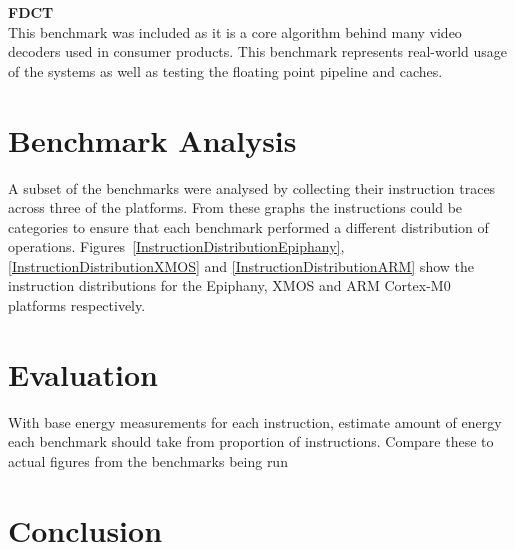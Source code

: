 \documentclass[twocolumn]{article}
\newcommand{\nsection}[1]{\section{\bfseries #1}}
\begin{document}
\vspace{3mm}
\textbf{FDCT}\\
This benchmark was included as it is a core algorithm behind many video decoders used in consumer products. This benchmark represents real-world usage of the systems as well as testing the floating point pipeline and caches.


\nsection{Benchmark Analysis}

A subset of the benchmarks were analysed by collecting their instruction traces across three of the platforms. From these graphs the instructions could be categories to ensure that each benchmark performed a different distribution of operations. Figures~\ref{InstructionDistributionEpiphany}, \ref{InstructionDistributionXMOS} and \ref{InstructionDistributionARM} show the instruction distributions for the Epiphany, XMOS and ARM Cortex-M0 platforms respectively.


\nsection{Evaluation}

With base energy measurements for each instruction, estimate amount of energy each benchmark should take from proportion of instructions. Compare these to actual figures from the benchmarks being run

\nsection{Conclusion}

\printbibliography
\end{document}

